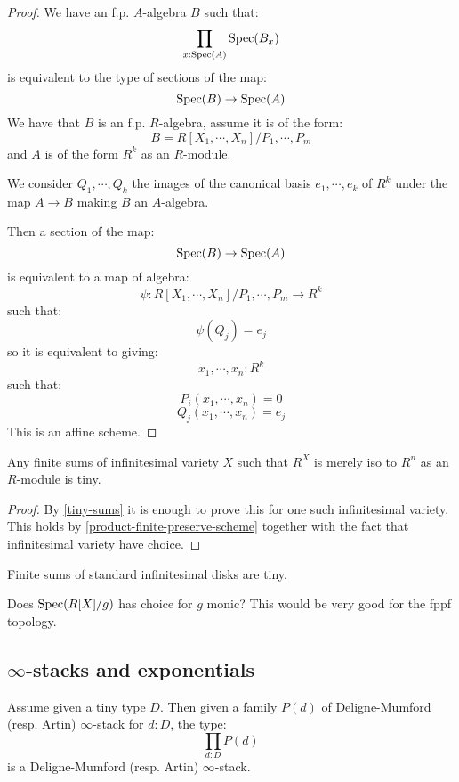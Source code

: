 \begin{proof}
We have an f.p. $A$-algebra $B$ such that:
\[\prod_{x:\operatorname{Spec}(A)}\operatorname{Spec}(B_x)\]
is equivalent to the type of sections of the map:
\[\operatorname{Spec}(B)\to\operatorname{Spec}(A)\]
We have that $B$ is an f.p. $R$-algebra, assume it is of the form:
\[B = R[X_1,\cdots,X_n]/P_1,\cdots,P_m\]
and $A$ is of the form $R^k$ as an $R$-module. 

We consider $Q_1,\cdots,Q_k$ the images of the canonical basis $e_1,\cdots,e_k$ of $R^k$ under the map $A\to B$ making $B$ an $A$-algebra.

Then a section of the map:
\[\operatorname{Spec}(B)\to\operatorname{Spec}(A)\] 
is equivalent to a map of algebra:
\[\psi: R[X_1,\cdots,X_n]/P_1,\cdots,P_m \to R^k\]
such that:
\[\psi(Q_j) = e_j\]
so it is equivalent to giving:
\[x_1,\cdots,x_n : R^k\]
such that:
\[P_i(x_1,\cdots,x_n) = 0\]
\[Q_j(x_1,\cdots,x_n) = e_j\]
This is an affine scheme.
\end{proof}

\begin{lemma}\label{sums-infinitesimal-tiny}
Any finite sums of infinitesimal variety $X$ such that $R^X$ is merely iso to $R^n$ as an $R$-module is tiny.
\end{lemma}

\begin{proof}
By \cref{tiny-sums} it is enough to prove this for one such infinitesimal variety. This holds by \cref{product-finite-preserve-scheme} together with the fact that infinitesimal variety have choice.
\end{proof}

\begin{example}
Finite sums of standard infinitesimal disks are tiny.
\end{example}

Does $\operatorname{Spec}(R[X]/g)$ has choice for $g$ monic? This would be very good for the fppf topology.

\subsection{$\infty$-stacks and exponentials}

\begin{lemma}
Assume given a tiny type $D$. Then given a family $P(d)$ of Deligne-Mumford (resp. Artin) $\infty$-stack for $d:D$, the type:
\[\prod_{d:D}P(d)\]
is a Deligne-Mumford (resp. Artin) $\infty$-stack.
\end{lemma}

